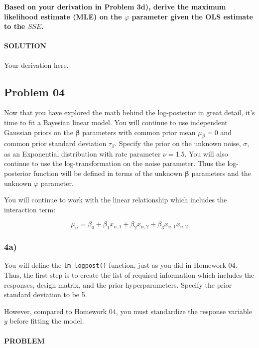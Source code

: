 \documentclass[
]{article}
\begin{document}
\textbf{Based on your derivation in Problem 3d), derive the maximum
likelihood estimate (MLE) on the \(\varphi\) parameter given the OLS
estimate to the \(SSE\).}

\hypertarget{solution-17}{%
\paragraph{SOLUTION}\label{solution-17}}

Your derivation here.

\hypertarget{problem-04}{%
\subsection{Problem 04}\label{problem-04}}

Now that you have explored the math behind the log-posterior in great
detail, it's time to fit a Bayesian linear model. You will continue to
use independent Gaussian priors on the \(\boldsymbol{\beta}\) parameters
with common prior mean \(\mu_{\beta}=0\) and common prior standard
deviation \(\tau_{\beta}\). Specify the prior on the unknown noise,
\(\sigma\), as an Exponential distribution with rate parameter
\(\nu = 1.5\). You will also continue to use the log-transformation on
the noise parameter. Thus the log-posterior function will be defined in
terms of the unknown \(\boldsymbol{\beta}\) parameters and the unknown
\(\varphi\) parameter.

You will continue to work with the linear relationship which includes
the interaction term:

\[ 
\mu_n = \beta_0 + \beta_1 x_{n,1} + \beta_2 x_{n,2} + \beta_3 x_{n,1} x_{n,2}
\]

\hypertarget{a-3}{%
\subsubsection{4a)}\label{a-3}}

You will define the \texttt{lm\_logpost()} function, just as you did in
Homework 04. Thus, the first step is to create the list of required
information which includes the responses, design matrix, and the prior
hyperparameters. Specify the prior standard deviation to be 5.

However, compared to Homework 04, you must standardize the response
variable \(y\) before fitting the model.

\hypertarget{problem-18}{%
\paragraph{PROBLEM}\label{problem-18}}
\end{document}
